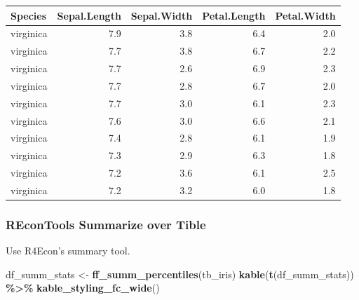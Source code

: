 \documentclass[
]{book}
\newenvironment{Shaded}{\begin{snugshade}}{\end{snugshade}}
\newcommand{\KeywordTok}[1]{\textcolor[rgb]{0.13,0.29,0.53}{\textbf{#1}}}
\newcommand{\NormalTok}[1]{#1}
\newcommand{\OperatorTok}[1]{\textcolor[rgb]{0.81,0.36,0.00}{\textbf{#1}}}
\newcommand{\StringTok}[1]{\textcolor[rgb]{0.31,0.60,0.02}{#1}}
\begin{document}
\begin{table}[!h]
\centering
\begin{tabular}{l|r|r|r|r}
\hline
Species & Sepal.Length & Sepal.Width & Petal.Length & Petal.Width\\
\hline
\rowcolor{gray!6}  virginica & 7.9 & 3.8 & 6.4 & 2.0\\
\hline
virginica & 7.7 & 3.8 & 6.7 & 2.2\\
\hline
\rowcolor{gray!6}  virginica & 7.7 & 2.6 & 6.9 & 2.3\\
\hline
virginica & 7.7 & 2.8 & 6.7 & 2.0\\
\hline
\rowcolor{gray!6}  virginica & 7.7 & 3.0 & 6.1 & 2.3\\
\hline
virginica & 7.6 & 3.0 & 6.6 & 2.1\\
\hline
\rowcolor{gray!6}  virginica & 7.4 & 2.8 & 6.1 & 1.9\\
\hline
virginica & 7.3 & 2.9 & 6.3 & 1.8\\
\hline
\rowcolor{gray!6}  virginica & 7.2 & 3.6 & 6.1 & 2.5\\
\hline
virginica & 7.2 & 3.2 & 6.0 & 1.8\\
\hline
\end{tabular}
\end{table}

\hypertarget{recontools-summarize-over-tible}{%
\subsubsection{REconTools Summarize over Tible}\label{recontools-summarize-over-tible}}

Use R4Econ's summary tool.

\begin{Shaded}
\begin{Highlighting}[]
\NormalTok{df\_summ\_stats \textless{}{-}}\StringTok{ }\KeywordTok{ff\_summ\_percentiles}\NormalTok{(tb\_iris)}
\KeywordTok{kable}\NormalTok{(}\KeywordTok{t}\NormalTok{(df\_summ\_stats)) }\OperatorTok{\%\textgreater{}\%}\StringTok{ }\KeywordTok{kable\_styling\_fc\_wide}\NormalTok{()}
\end{Highlighting}
\end{Shaded}
\end{document}
